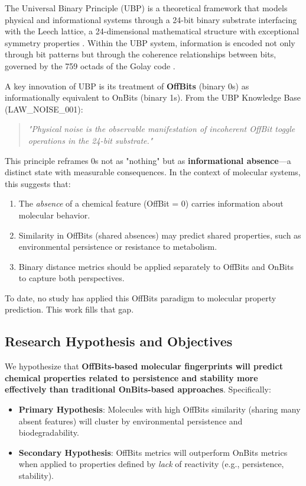 \documentclass[11pt,letterpaper]{article}
\begin{document}
The Universal Binary Principle (UBP) is a theoretical framework that models physical and informational systems through a 24-bit binary substrate interfacing with the Leech lattice, a 24-dimensional mathematical structure with exceptional symmetry properties \cite{conway1999sphere}. Within the UBP system, information is encoded not only through bit patterns but through the coherence relationships between bits, governed by the 759 octads of the Golay code \cite{berlekamp1974algebraic}.

A key innovation of UBP is its treatment of \textbf{OffBits} (binary 0s) as informationally equivalent to OnBits (binary 1s). From the UBP Knowledge Base (LAW\_NOISE\_001):

\begin{quote}
\textit{"Physical noise is the observable manifestation of incoherent OffBit toggle operations in the 24-bit substrate."}
\end{quote}

This principle reframes 0s not as "nothing" but as \textbf{informational absence}—a distinct state with measurable consequences. In the context of molecular systems, this suggests that:

\begin{enumerate}
    \item The \textit{absence} of a chemical feature (OffBit = 0) carries information about molecular behavior.
    \item Similarity in OffBits (shared absences) may predict shared properties, such as environmental persistence or resistance to metabolism.
    \item Binary distance metrics should be applied separately to OffBits and OnBits to capture both perspectives.
\end{enumerate}

To date, no study has applied this OffBits paradigm to molecular property prediction. This work fills that gap.

\subsection{Research Hypothesis and Objectives}

We hypothesize that \textbf{OffBits-based molecular fingerprints will predict chemical properties related to persistence and stability more effectively than traditional OnBits-based approaches}. Specifically:

\begin{itemize}
    \item \textbf{Primary Hypothesis}: Molecules with high OffBits similarity (sharing many absent features) will cluster by environmental persistence and biodegradability.
    \item \textbf{Secondary Hypothesis}: OffBits metrics will outperform OnBits metrics when applied to properties defined by \textit{lack} of reactivity (e.g., persistence, stability).
\end{itemize}
\end{document}
